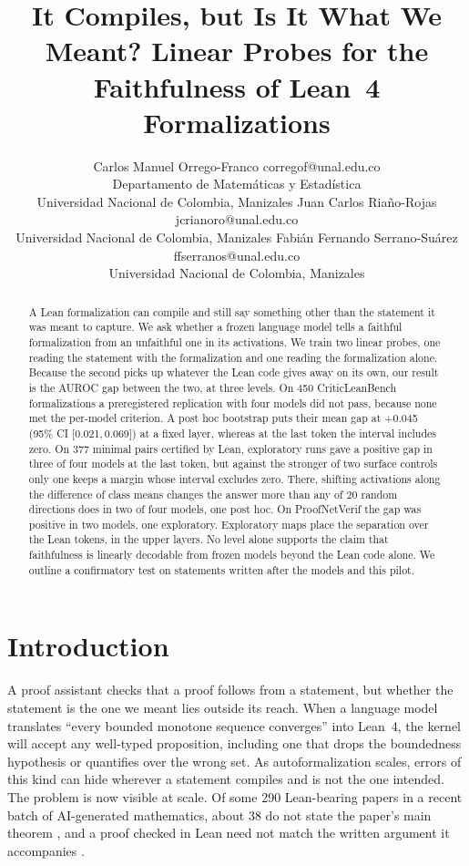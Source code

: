 \documentclass[10pt]{article}
\title{It Compiles, but Is It What We Meant? Linear Probes for the Faithfulness of Lean~4 Formalizations}
\author{\name Carlos Manuel Orrego-Franco \email corregof@unal.edu.co \\
      \addr Departamento de Matem\'aticas y Estad\'istica\\
      Universidad Nacional de Colombia, Manizales
      \AND
      \name Juan Carlos Ria\~no-Rojas \email jcrianoro@unal.edu.co \\
      \addr Universidad Nacional de Colombia, Manizales
      \AND
      \name Fabi\'an Fernando Serrano-Su\'arez \email ffserranos@unal.edu.co \\
      \addr Universidad Nacional de Colombia, Manizales}
\newcommand{\ic}[2]{[#1,\,#2]}
\begin{document}
\maketitle

\begin{abstract}
A Lean formalization can compile and still say something other than the statement it was meant to capture. We ask
whether a frozen language model tells a faithful formalization from an unfaithful one in its activations. We train two
linear probes, one reading the statement with the formalization and one reading the formalization alone. Because the
second picks up whatever the Lean code gives away on its own, our result is the AUROC gap between the two, at three
levels. On 450 CriticLeanBench formalizations a preregistered replication with four models did not pass, because none
met the per-model criterion. A post hoc bootstrap puts their mean gap at +0.045 (95\% CI \ic{0.021}{0.069}) at a fixed
layer, whereas at the last token the interval includes zero. On 377 minimal pairs certified by Lean, exploratory runs
gave a positive gap in three of four models at the last token, but against the stronger of two surface controls only
one keeps a margin whose interval excludes zero. There, shifting activations along the difference of class means
changes the answer more than any of 20 random directions does in two of four models, one post hoc. On ProofNetVerif
the gap was positive in two models, one exploratory. Exploratory maps place the separation over the Lean tokens, in
the upper layers. No level alone supports the claim that faithfulness is linearly decodable from frozen models beyond
the Lean code alone. We outline a confirmatory test on statements written after the models and this pilot.
\end{abstract}

\section{Introduction}

A proof assistant checks that a proof follows from a statement, but whether the statement is the one we meant lies
outside its reach. When a language model translates ``every bounded monotone sequence converges'' into Lean~4, the
kernel will accept any well-typed proposition, including one that drops the boundedness hypothesis or quantifies
over the wrong set. As autoformalization scales, errors of this kind can hide wherever a statement compiles and is
not the one intended.
The problem is now visible at scale. Of some 290 Lean-bearing papers in a recent batch of AI-generated mathematics, about
38 do not state the paper's main theorem \citep{xena2026checked}, and a proof checked in Lean need not match the
written argument it accompanies \citep{bastounis2026lost}.
\end{document}
